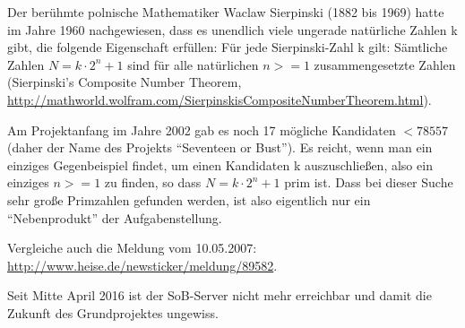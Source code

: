 \begin{refsegment}
{Der berühmte polnische Mathematiker Waclaw Sierpinski (1882 bis 1969) hatte im
Jahre 1960 nachgewiesen, dass es unendlich viele ungerade natürliche Zahlen k gibt,
die folgende Eigenschaft erfüllen: Für jede Sierpinski-Zahl k gilt: Sämtliche Zahlen
$N = k \cdot 2^{n}+1$ sind für alle natürlichen $n>=1$ zusammengesetzte Zahlen
(Sierpinski's Composite Number Theorem,
\url{http://mathworld.wolfram.com/SierpinskisCompositeNumberTheorem.html}).

Am Projektanfang im Jahre 2002 gab es noch 17 mögliche Kandidaten $< 78557$ (daher der Name des Projekts "`Seventeen or Bust"'). Es reicht, wenn man ein einziges Gegenbeispiel findet, um einen Kandidaten k auszuschließen, also ein einziges $n>=1$ zu finden, so dass $N = k \cdot 2^{n}+1$ prim ist. Dass bei dieser Suche sehr große Primzahlen gefunden werden, ist also eigentlich nur ein "`Nebenprodukt"' der Aufgabenstellung.

Vergleiche auch die Meldung vom 10.05.2007: %
\url{http://www.heise.de/newsticker/meldung/89582}.

Seit Mitte April 2016 ist der SoB-Server nicht mehr erreichbar und damit die Zukunft des Grundprojektes ungewiss.
}
\addtocounter{footnote}{1}






\end{refsegment}
